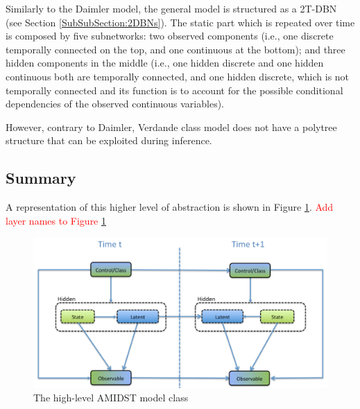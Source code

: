 
Similarly to the Daimler model, the general model is structured as a 2T-DBN (see Section \ref{SubSubSection:2DBNs}). The static part which is repeated over time is composed by five subnetworks: two observed components (i.e., one discrete temporally connected on the top, and one continuous at the bottom); and three hidden components in the middle (i.e., one hidden discrete and one hidden continuous both are temporally connected, and one hidden discrete, which is not temporally connected and its function is to account for the possible conditional dependencies of the observed continuous variables).  

However, contrary to Daimler, Verdande class model does not have a polytree structure that can be exploited during inference. 


\subsection{Summary}\label{summaryAMIDSTModels}

A representation of this higher level of abstraction is shown in Figure \ref{Figure:AMIDSTModelClassHighLevel}. \textcolor{red}{Add layer names to Figure \ref{Figure:AMIDSTModelClassHighLevel}}

\begin{figure}[ht!]
\begin{center}
\includegraphics[scale=0.4]{./figures/AMIDSTModelClassGeneral}
\caption{\label{Figure:AMIDSTModelClassHighLevel} The high-level AMIDST model class}
\end{center}
\end{figure}


